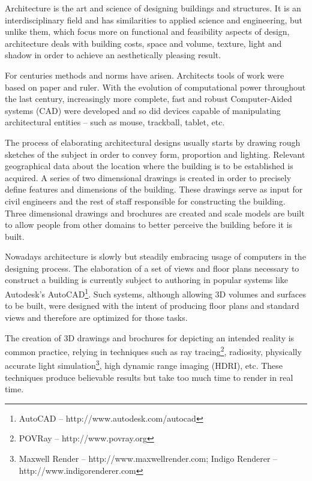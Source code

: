 
Architecture is the art and science of designing buildings and structures.
It is an interdisciplinary field and has similarities to applied science and
engineering, but unlike them, which focus more on functional and feasibility aspects of design, 
architecture deals with building costs, space and volume, texture, light and shadow
in order to achieve an aesthetically pleasing result.

For centuries methods and norms have arisen. Architects tools of work were based on paper and ruler.
With the evolution of computational power throughout the last century, 
increasingly more complete, fast and robust Computer-Aided systems (CAD) were developed and so did
devices capable of manipulating architectural entities -- such as mouse, trackball, tablet, etc.

The process of elaborating architectural designs usually starts by drawing rough sketches of the subject
in order to convey form, proportion and lighting. Relevant geographical data about the location
where the building is to be established is acquired. A series of two dimensional drawings is created
in order to precisely define features and dimensions of the building. These drawings serve as
input for civil engineers and the rest of staff responsible for constructing the building.
Three dimensional drawings and brochures are created and scale models are built to allow
people from other domains to better perceive the building before it is built.

Nowadays architecture is slowly but steadily embracing usage of computers in the designing process.
The elaboration of a set of views and floor plans necessary to construct a building is currently
subject to authoring in popular systems like Autodesk's AutoCAD\footnote{AutoCAD -- http://www.autodesk.com/autocad}.
Such systems, although allowing 3D volumes and surfaces to be built, were designed with the intent of
producing floor plans and standard views and therefore are optimized for those tasks.

The creation of 3D drawings and brochures for depicting an intended reality is common practice,
relying in techniques such as
ray tracing\footnote{POVRay -- http://www.povray.org},
radiosity,
physically accurate light simulation\footnote{Maxwell Render -- http://www.maxwellrender.com; Indigo Renderer -- http://www.indigorenderer.com},
high dynamic range imaging (HDRI), etc.
These techniques produce believable results but take too much time to render in real time.

